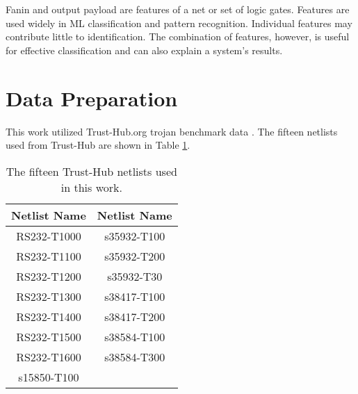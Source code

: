 Fanin and output payload are features of a net or set of logic gates. Features
are used widely in ML classification and pattern recognition. Individual
features may contribute little to identification. The combination of features,
however, is useful for effective classification and can also explain a system's
results.

\section{Data Preparation} \label{trojan_data_prep}

This work utilized Trust-Hub.org trojan benchmark data \cite{6657085,
shakya2017benchmarking, px6s-sm21-22, slayback2015computer}.  The fifteen
netlists used from Trust-Hub are shown in Table \ref{tab:netlists_used}.

\begin{table}[h]
    \renewcommand{\arraystretch}{1.3}
    \centering
    \caption{The fifteen Trust-Hub netlists used in this work.}
    \begin{tabular}{|c||c|}
        \hline
        \bfseries Netlist Name & \bfseries Netlist Name \\
        \hline
        \hline
        RS232-T1000 & s35932-T100 \\
        \hline
        RS232-T1100 & s35932-T200 \\
        \hline
        RS232-T1200 & s35932-T30 \\
        \hline
        RS232-T1300 & s38417-T100 \\
        \hline
        RS232-T1400 & s38417-T200 \\
        \hline
        RS232-T1500 & s38584-T100 \\
        \hline
        RS232-T1600 & s38584-T300 \\
        \hline
        s15850-T100  \\
        \cline{0-0}
    \end{tabular}
    \label{tab:netlists_used}
\end{table}


